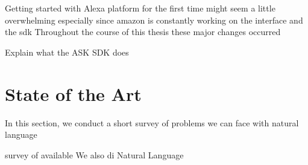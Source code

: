 Getting started with Alexa platform for the first time might seem a little overwhelming especially since amazon is constantly working on the interface and the sdk 
Throughout the course of this thesis these major changes occurred 

Explain what the ASK SDK does



\section{State of the Art}

In this section, we conduct a short survey of problems we can face with natural language

survey of available 
We also di
Natural Language



